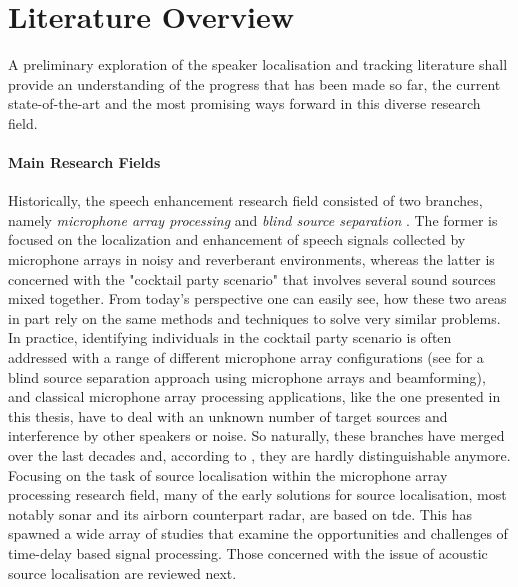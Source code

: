 \section{Literature Overview}

A preliminary exploration of the speaker localisation and tracking literature shall provide an understanding of the progress that has been made so far, the current state-of-the-art and the most promising ways forward in this diverse research field.
\paragraph{Main Research Fields}
Historically, the speech enhancement research field consisted of two branches, namely \textit{microphone array processing} and \textit{blind source separation} \cite[p.~693]{Gannot2017}. The former is focused on the localization and enhancement of speech signals collected by microphone arrays in noisy and reverberant environments, whereas the latter is concerned with the "cocktail party scenario" that involves several sound sources mixed together. From today's perspective one can easily see, how these two areas in part rely on the same methods and techniques to solve very similar problems. In practice, identifying individuals in the cocktail party scenario is often addressed with a range of different microphone array configurations (see \cite{Wang2013} for a blind source separation approach using microphone arrays and beamforming), and classical microphone array processing applications, like the one presented in this thesis, have to deal with an unknown number of target sources and interference by other speakers or noise. So naturally, these branches have merged over the last decades and, according to \cite[p.~693]{Gannot2017}, they are hardly distinguishable anymore. Focusing on the task of source localisation within the microphone array processing research field, many of the early solutions for source localisation, most notably sonar \cite{Hackmann1986} and its airborn counterpart radar, are based on \gls{tde}. This has spawned a wide array of studies that examine the opportunities and challenges of time-delay based signal processing. Those concerned with the issue of acoustic source localisation are reviewed next.

